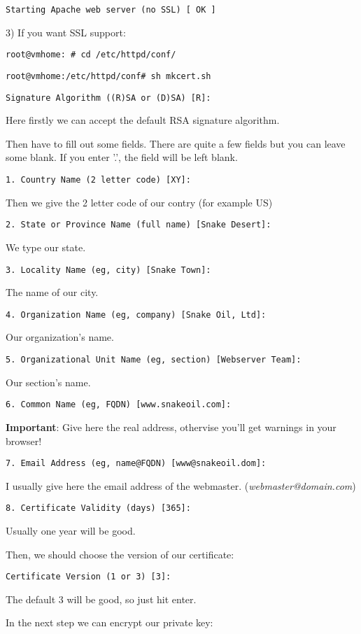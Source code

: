 {\tt Starting Apache web server (no SSL)        [  OK  ]}

3) If you want SSL support:

{\tt root@vmhome:~# cd /etc/httpd/conf/}

{\tt root@vmhome:/etc/httpd/conf# sh mkcert.sh}

{\tt Signature Algorithm ((R)SA or (D)SA) [R]:}

Here firstly we can accept the default RSA signature algorithm.

Then have to fill out some fields. There are quite a few fields but you can leave some blank.
If you enter '.', the field will be left blank.

{\tt 1. Country Name             (2 letter code) [XY]:}

Then we give the 2 letter code of our contry (for example US)

{\tt 2. State or Province Name   (full name)     [Snake Desert]:}

We type our state.

{\tt 3. Locality Name            (eg, city)      [Snake Town]:}

The name of our city.

{\tt 4. Organization Name        (eg, company)   [Snake Oil, Ltd]:}

Our organization's name.

{\tt 5. Organizational Unit Name (eg, section)   [Webserver Team]:}

Our section's name.

{\tt 6. Common Name              (eg, FQDN)      [www.snakeoil.com]:}

\textbf{Important}: Give here the real address, othervise you'll get warnings in your browser!

{\tt 7. Email Address            (eg, name@FQDN) [www@snakeoil.dom]:}

I usually give here the email address of the webmaster. (\textit{webmaster@domain.com})

{\tt 8. Certificate Validity     (days)          [365]:}

Usually one year will be good.

Then, we should choose the version of our certificate:

{\tt Certificate Version (1 or 3) [3]:}

The default 3 will be good, so just hit enter.

In the next step we can encrypt our private key:

